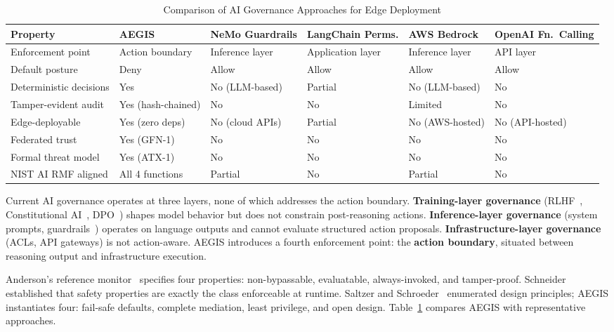 \documentclass[journal]{IEEEtran}
\begin{document}
\begin{table}[t]
\centering
\caption{Comparison of AI Governance Approaches for Edge Deployment}
\label{tab:comparison}
\begin{tabularx}{\textwidth}{@{}l *{5}{>{\centering\arraybackslash}X} @{}}
\toprule
\textbf{Property} & \textbf{AEGIS} & \textbf{NeMo Guardrails} & \textbf{LangChain Perms.} & \textbf{AWS Bedrock} & \textbf{OpenAI Fn.\ Calling} \\
\midrule
Enforcement point & Action boundary & Inference layer & Application layer & Inference layer & API layer \\
Default posture & Deny & Allow & Allow & Allow & Allow \\
Deterministic decisions & Yes & No (LLM-based) & Partial & No (LLM-based) & No \\
Tamper-evident audit & Yes (hash-chained) & No & No & Limited & No \\
Edge-deployable & Yes (zero deps) & No (cloud APIs) & Partial & No (AWS-hosted) & No (API-hosted) \\
Federated trust & Yes (GFN-1) & No & No & No & No \\
Formal threat model & Yes (ATX-1) & No & No & No & No \\
NIST AI RMF aligned & All 4 functions & Partial & No & Partial & No \\
\bottomrule
\end{tabularx}
\end{table}

Current AI governance operates at three layers, none of which addresses the action boundary. \textbf{Training-layer governance} (RLHF~\cite{christiano2017}, Constitutional AI~\cite{bai2022}, DPO~\cite{rafailov2023}) shapes model behavior but does not constrain post-reasoning actions. \textbf{Inference-layer governance} (system prompts, guardrails~\cite{nemo_guardrails}) operates on language outputs and cannot evaluate structured action proposals. \textbf{Infrastructure-layer governance} (ACLs, API gateways) is not action-aware. AEGIS introduces a fourth enforcement point: the \textbf{action boundary}, situated between reasoning output and infrastructure execution.

Anderson's reference monitor~\cite{anderson1972} specifies four properties: non-bypassable, evaluatable, always-invoked, and tamper-proof. Schneider~\cite{schneider2000} established that safety properties are exactly the class enforceable at runtime. Saltzer and Schroeder~\cite{saltzer1975} enumerated design principles; AEGIS instantiates four: fail-safe defaults, complete mediation, least privilege, and open design. Table~\ref{tab:comparison} compares AEGIS with representative approaches.
\end{document}
